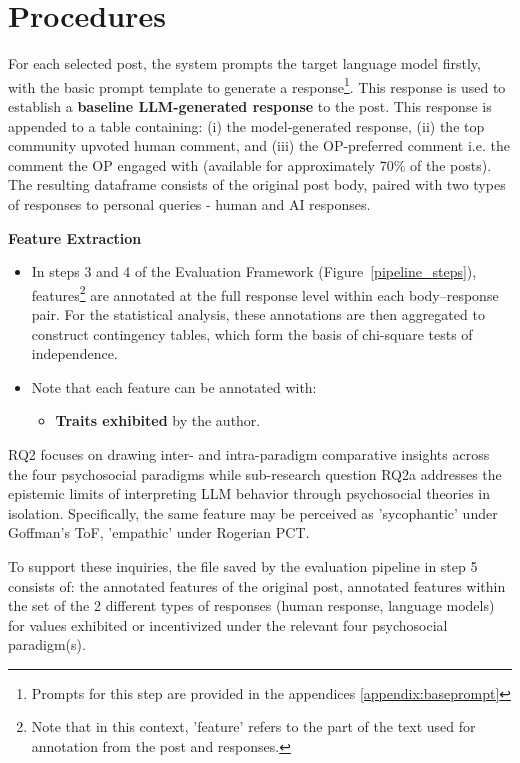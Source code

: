 \section{Procedures}
For each selected post, the system prompts the target language model firstly, with the basic prompt template to generate a response\footnote{\smallskip Prompts for this step are provided in the appendices \ref{appendix:baseprompt}}. This response is used to establish a \textbf{baseline LLM-generated response} to the post. This response is appended to a table containing: (i) the model-generated response, (ii) the top community upvoted human comment, and (iii) the OP-preferred comment i.e. the comment the OP engaged with (available for approximately 70\% of the posts). The resulting dataframe consists of the original post body, paired with two types of responses to personal queries - human and AI responses.

\medskip 
\textbf{Feature Extraction}

\smallskip 
\begin{itemize}
    \item In steps 3 and 4 of the Evaluation Framework (Figure~\ref{pipeline_steps}), features\footnote{Note that in this context, 'feature' refers to the part of the text used for annotation from the post and responses.} are annotated at the full response level within each body–response pair. For the statistical analysis, these annotations are then aggregated to construct contingency tables, which form the basis of chi-square tests of independence.
    \item Note that each feature can be annotated with:
    \begin{itemize}
        \item \textbf{Traits exhibited} by the author.
    \end{itemize}
\end{itemize}

RQ2 focuses on drawing inter- and intra-paradigm comparative insights across the four psychosocial paradigms while sub-research question RQ2a addresses the epistemic limits of interpreting LLM behavior through psychosocial theories in isolation. Specifically, the same feature may be perceived as 'sycophantic' under Goffman’s ToF, 'empathic' under Rogerian PCT.

To support these inquiries, the file saved by the evaluation pipeline in step 5 consists of: the annotated features of the original post, annotated features within the set of the 2 different types of responses (human response, language models) for values exhibited or incentivized under the relevant four psychosocial paradigm(s).

